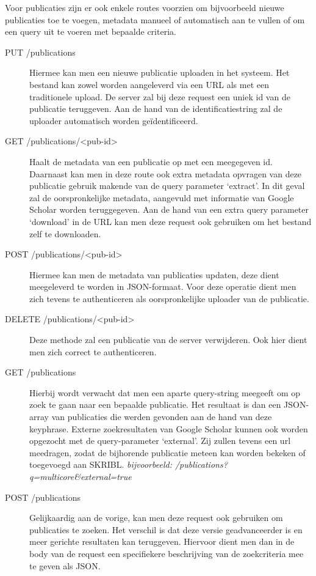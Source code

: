 \documentclass{article}
\begin{document}
Voor publicaties zijn er ook enkele routes voorzien om bijvoorbeeld nieuwe publicaties toe te voegen, metadata manueel of automatisch aan te vullen of om een query uit te voeren met bepaalde criteria.

\begin{description}

\item[PUT /publications] Hiermee kan men een nieuwe publicatie uploaden in het systeem. Het bestand kan zowel worden aangeleverd via een URL als met een traditionele upload. De server zal bij deze request een uniek id van de publicatie teruggeven. Aan de hand van de identificatiestring zal de uploader automatisch worden ge\"identificeerd.

\item[GET /publications/<pub-id>] Haalt de metadata van een publicatie op met een meegegeven id. Daarnaast kan men in deze route ook extra metadata opvragen van deze publicatie gebruik makende van de query parameter `extract'. In dit geval zal de oorspronkelijke metadata, aangevuld met informatie van Google Scholar worden teruggegeven. Aan de hand van een extra query parameter `download' in de URL kan men deze request ook gebruiken om het bestand zelf te downloaden. 

\item[POST /publications/<pub-id>] Hiermee kan men de metadata van publicaties updaten, deze dient meegeleverd te worden in JSON-formaat. Voor deze operatie dient men zich tevens te authenticeren als oorspronkelijke uploader van de publicatie.

\item[DELETE /publications/<pub-id>] Deze methode zal een publicatie van de server verwijderen. Ook hier dient men zich correct te authenticeren.

\item[GET /publications] Hierbij wordt verwacht dat men een aparte query-string meegeeft om op zoek te gaan naar een bepaalde publicatie. Het resultaat is dan een JSON-array van publicaties die werden gevonden aan de hand van deze keyphrase. Externe zoekresultaten van Google Scholar kunnen ook worden opgezocht met de query-parameter `external'. Zij zullen tevens een url meedragen, zodat de bijhorende publicatie meteen kan worden bekeken of toegevoegd aan SKRIBL.
\textit{bijvoorbeeld: /publications?q=multicore\&external=true}

\item[POST /publications] Gelijkaardig aan de vorige, kan men deze request ook gebruiken om publicaties te zoeken. Het verschil is dat deze versie geadvanceerder is en meer gerichte resultaten kan teruggeven. Hiervoor dient men dan in de body van de request een specifiekere beschrijving van de zoekcriteria mee te geven als JSON.

\end{description}
\end{document}
